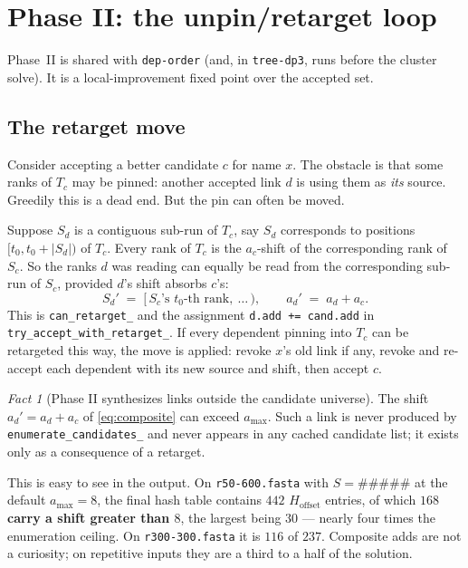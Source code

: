 \documentclass[11pt,a4paper]{article}
\theoremstyle{definition}
\theoremstyle{plain}
\theoremstyle{remark}
\newtheorem{fact}{Fact}
\begin{document}
\section{Phase II: the unpin/retarget loop}
\label{sec:phase2}

Phase~II is shared with \texttt{dep-order} (and, in \texttt{tree-dp3},
runs before the cluster solve). It is a local-improvement fixed point
over the accepted set.

\subsection{The retarget move}

Consider accepting a better candidate $c$ for name $x$. The obstacle is
that some ranks of $T_c$ may be pinned: another accepted link $d$ is
using them as \emph{its} source. Greedily this is a dead end. But the
pin can often be moved.

Suppose $S_d$ is a contiguous sub-run of $T_c$, say $S_d$ corresponds to
positions $[t_0, t_0 + |S_d|)$ of $T_c$. Every rank of $T_c$ is the
$a_c$-shift of the corresponding rank of $S_c$. So the ranks $d$ was
reading can equally be read from the corresponding sub-run of $S_c$,
provided $d$'s shift absorbs $c$'s:
\begin{equation}
  S_d' \;=\; \bigl[\,S_c\text{'s } t_0\text{-th rank},\ \dots\,\bigr),
  \qquad
  a_d' \;=\; a_d + a_c .
  \label{eq:composite}
\end{equation}
This is \texttt{can\_retarget\_} and the assignment
\texttt{d.add += cand.add} in
\texttt{try\_accept\_with\_retarget\_}. If every dependent pinning into
$T_c$ can be retargeted this way, the move is applied: revoke $x$'s old
link if any, revoke and re-accept each dependent with its new source and
shift, then accept $c$.

\begin{fact}[Phase II synthesizes links outside the candidate universe]
\label{fact:composite}
The shift $a_d' = a_d + a_c$ of \eqref{eq:composite} can exceed
$a_{\max}$. Such a link is never produced by
\texttt{enumerate\_candidates\_} and never appears in any cached
candidate list; it exists only as a consequence of a retarget.
\end{fact}

This is easy to see in the output. On \texttt{r50-600.fasta} with
$S = \mathtt{\#\#\#\#\#}$ at the default $a_{\max} = 8$, the final hash
table contains $442$ $H_{\mathrm{offset}}$ entries, of which
\textbf{$168$ carry a shift greater than $8$}, the largest being $30$
--- nearly four times the enumeration ceiling. On
\texttt{r300-300.fasta} it is $116$ of $237$. Composite adds are not a
curiosity; on repetitive inputs they are a third to a half of the
solution.
\end{document}
